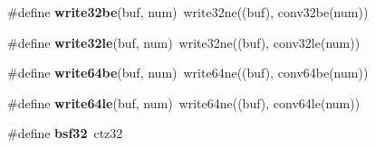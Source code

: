 \begin{DoxyCompactItemize}
\mbox{\label{tuklib__integer_8h_af4f4e88616e71eb539a9dd7589475fa1}} 
\#define {\bfseries write32be}(buf,  num)~write32ne((buf), conv32be(num))
\item 
\mbox{\label{tuklib__integer_8h_af29be033fcc28c5c2b11a7f580761e79}} 
\#define {\bfseries write32le}(buf,  num)~write32ne((buf), conv32le(num))
\item 
\mbox{\label{tuklib__integer_8h_ab6fb0927aa9e804d9200ffdab0c23b40}} 
\#define {\bfseries write64be}(buf,  num)~write64ne((buf), conv64be(num))
\item 
\mbox{\label{tuklib__integer_8h_a097c6c866bd97162c7f01eb73433a068}} 
\#define {\bfseries write64le}(buf,  num)~write64ne((buf), conv64le(num))
\item 
\mbox{\label{tuklib__integer_8h_a510e889b2b5726d0e44c11b88cfc80bf}} 
\#define {\bfseries bsf32}~ctz32
\end{DoxyCompactItemize}
